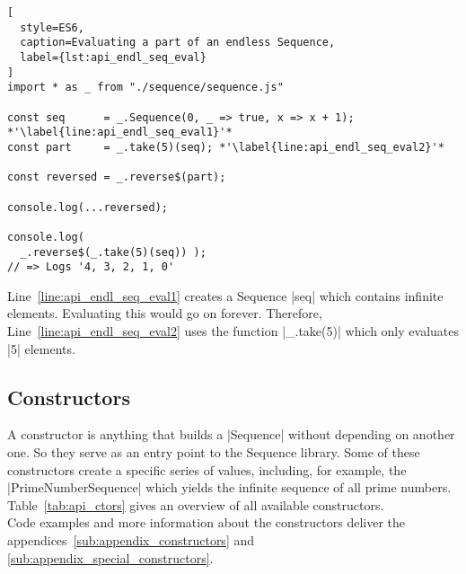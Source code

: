 \begin{lstlisting}[
  style=ES6,
  caption=Evaluating a part of an endless Sequence,
  label={lst:api_endl_seq_eval}
]
import * as _ from "./sequence/sequence.js"

const seq      = _.Sequence(0, _ => true, x => x + 1); *'\label{line:api_endl_seq_eval1}'*
const part     = _.take(5)(seq); *'\label{line:api_endl_seq_eval2}'*

const reversed = _.reverse$(part);

console.log(...reversed);

console.log(
  _.reverse$(_.take(5)(seq)) );  
// => Logs '4, 3, 2, 1, 0'
\end{lstlisting}

Line~\ref{line:api_endl_seq_eval1} creates a Sequence |seq| which contains
infinite elements. Evaluating this would go on forever. Therefore,
Line~\ref{line:api_endl_seq_eval2} uses the function |_.take(5)| which only
evaluates |5| elements.

\label{sec:api_sequences}
\subsection{Constructors} %
\label{sub:Constructors}
A constructor is anything that builds a |Sequence| without depending on another
one. So they serve as an entry point to the Sequence library. Some of these
constructors create a specific series of values, including, for example, the
|PrimeNumberSequence| which yields the infinite sequence of all prime
numbers.\\
Table~\ref{tab:api_ctors} gives an overview of all available constructors. \\
Code examples and more information about the constructors deliver the
appendices~\ref{sub:appendix_constructors} and
\ref{sub:appendix_special_constructors}.

